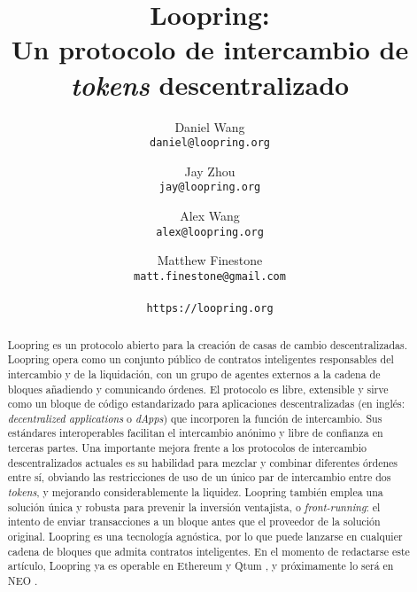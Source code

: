 \documentclass[UTF8,nofonts]{article}
\title{\textbf{Loopring:}\\\textbf{Un protocolo de intercambio de \textit{tokens} descentralizado}}
\author{
  Daniel Wang\\
  \texttt{daniel@loopring.org}\\
  \and
  	Jay Zhou\\
  	\texttt{jay@loopring.org}\\
  	\and
  	Alex Wang\\
  	\texttt{alex@loopring.org}\\
  	\and
  	Matthew Finestone\\
  	\texttt{matt.finestone@gmail.com}\\ 
  \\
  \texttt{https://loopring.org}
 }
\begin{document}
\maketitle


\begin{abstract}
Loopring es un protocolo abierto para la creación de casas de cambio descentralizadas. Loopring opera como un conjunto público de contratos inteligentes responsables del intercambio y de la liquidación, con un grupo de agentes externos a la cadena de bloques añadiendo y comunicando órdenes. El protocolo es libre, extensible y sirve como un bloque de código estandarizado para aplicaciones descentralizadas (en inglés: \textit{decentralized applications} o \textit{dApps}) que incorporen la función de intercambio. Sus estándares interoperables facilitan el intercambio anónimo y libre de confianza en terceras partes. Una importante mejora frente a los protocolos de intercambio descentralizados actuales es su habilidad para mezclar y combinar diferentes órdenes entre sí, obviando las restricciones de uso de un único par de intercambio entre dos \textit{tokens}, y mejorando considerablemente la liquidez. Loopring también emplea una solución única y robusta para prevenir la inversión ventajista, o \textit{front-running}: el intento de enviar transacciones a un bloque antes que el proveedor de la solución original. Loopring es una tecnología agnóstica, por lo que puede lanzarse en cualquier cadena de bloques que admita contratos inteligentes. En el momento de redactarse este artículo, Loopring ya es operable en Ethereum \cite{buterin2017ethereum} \cite{wood2014ethereum} y Qtum \cite{dai2017smart}, y próximamente lo será en NEO \cite{atterlonn2018distributed}.
\end{abstract}
\end{document}
